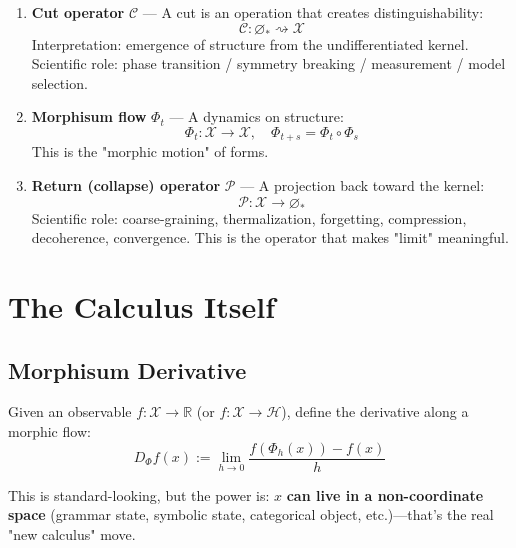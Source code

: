 \documentclass[12pt, oneside]{article}
\begin{document}
\begin{enumerate}
    \item \textbf{Cut operator} $\mathcal{C}$ — A cut is an operation that creates distinguishability:
    \begin{equation}
    \mathcal{C}: \varnothing_* \rightsquigarrow \mathcal{X}
    \end{equation}
    Interpretation: emergence of structure from the undifferentiated kernel. Scientific role: phase transition / symmetry breaking / measurement / model selection.
    
    \item \textbf{Morphisum flow} $\Phi_t$ — A dynamics on structure:
    \begin{equation}
    \Phi_t: \mathcal{X} \rightarrow \mathcal{X}, \quad \Phi_{t+s} = \Phi_t \circ \Phi_s
    \end{equation}
    This is the "morphic motion" of forms.
    
    \item \textbf{Return (collapse) operator} $\mathcal{P}$ — A projection back toward the kernel:
    \begin{equation}
    \mathcal{P}: \mathcal{X} \rightarrow \varnothing_*
    \end{equation}
    Scientific role: coarse-graining, thermalization, forgetting, compression, decoherence, convergence. This is the operator that makes "limit" meaningful.
\end{enumerate}

\section{The Calculus Itself}

\subsection{Morphisum Derivative}

Given an observable $f: \mathcal{X} \rightarrow \mathbb{R}$ (or $f: \mathcal{X} \rightarrow \mathcal{H}$), define the derivative along a morphic flow:
\begin{equation}
D_{\Phi}f(x) := \lim_{h \to 0} \frac{f(\Phi_h(x)) - f(x)}{h}
\end{equation}

This is standard-looking, but the power is: $x$ \textbf{can live in a non-coordinate space} (grammar state, symbolic state, categorical object, etc.)—that's the real "new calculus" move.
\end{document}

